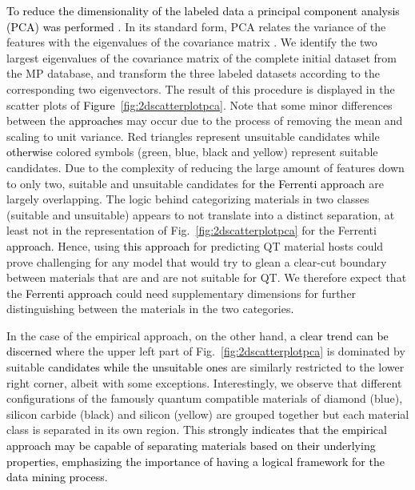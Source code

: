 \documentclass[superscriptaddress,unsortedaddress,
 amsmath,amssymb,
 aps,
]{revtex4-2}
\newcommand{\mrk}[1]{\textcolor{black}{#1}}
\begin{document}
\mrk{To reduce the dimensionality of the labeled data a principal component analysis (PCA) was performed \cite{Jolliffe2002}.} In its standard  form, PCA relates the variance of the features with the eigenvalues of the covariance matrix \cite{Jolliffe2002,Murphy2012,Hastie2009}. We identify the two largest eigenvalues of the covariance matrix \cite{Hastie2009} of the complete initial dataset from the MP database, and transform the three labeled datasets according to the corresponding two eigenvectors.
The result of this procedure is displayed in the scatter plots of \mrk{Figure}~\ref{fig:2dscatterplotpca}. Note that some minor differences between the \mrk{approaches} may occur due to the process of removing the mean and scaling to unit variance. Red triangles represent unsuitable candidates while \mrk{otherwise} colored symbols (green, blue, black and yellow) represent suitable candidates. 
Due to the complexity of reducing the large amount of features down to only two, suitable and unsuitable candidates for \mrk{the Ferrenti approach} are largely overlapping. 
The logic behind categorizing materials in two classes (suitable and unsuitable) appears to not translate into a distinct separation, at least not in the representation of Fig.~\ref{fig:2dscatterplotpca} for the Ferrenti \mrk{approach}.  
Hence, using \mrk{this approach} for predicting QT material hosts could prove challenging for any model that would try to glean a clear-cut boundary between materials that are and are not suitable for QT. 
We therefore expect that the \mrk{Ferrenti approach} could need supplementary dimensions for further distinguishing between the materials in the two categories\mrk{.} 

In the case of the empirical approach, on the other hand, \mrk{a clear trend can be discerned} where the upper left part of Fig.~\ref{fig:2dscatterplotpca} is dominated by suitable  %
\mrk{candidates while the unsuitable ones} are similarly restricted to the lower right corner, albeit with some exceptions. 
Interestingly, we observe that different configurations of the famously quantum compatible materials of diamond (blue), silicon carbide (black) and silicon (yellow) are grouped together but each material class is separated in its own region. 
This \mrk{strongly indicates that the empirical approach may be capable of separating materials based on their underlying properties, emphasizing the importance of having a logical framework for the data mining process}. %
\end{document}
